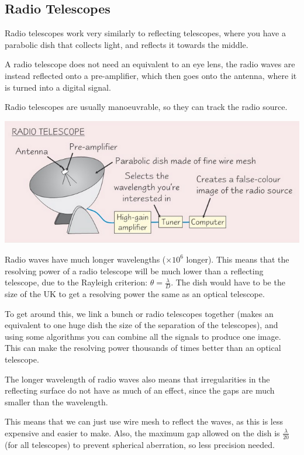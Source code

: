 \documentclass[a4paper, 12pt]{article}
\begin{document}
\subsection{Radio Telescopes}

Radio telescopes work very similarly to reflecting telescopes, where you have a parabolic dish that collects light, and reflects it towards the middle.

A radio telescope does not need an equivalent to an eye lens, the radio waves are instead reflected onto a pre-amplifier, which then goes onto the antenna, where it is turned into a digital signal.

Radio telescopes are usually manoeuvrable, so they can track the radio source.

\begin{center}
\includegraphics[width=\textwidth]{images/radioTelescope.png}
\end{center}

Radio waves have much longer wavelengths ($\times 10^6$ longer). This means that the resolving power of a radio telescope will be much lower than a reflecting telescope, due to the Rayleigh criterion: $\theta = \frac{\lambda}{D}$. The dish would have to be the size of the UK to get a resolving power the same as an optical telescope.

To get around this, we link a bunch or radio telescopes together (makes an equivalent to one huge dish the size of the separation of the telescopes), and using some algorithms you can combine all the signals to produce one image. This can make the resolving power thousands of times better than an optical telescope.

The longer wavelength of radio waves also means that irregularities in the reflecting surface do not have as much of an effect, since the gaps are much smaller than the wavelength.

This means that we can just use wire mesh to reflect the waves, as this is less expensive and easier to make. Also, the maximum gap allowed on the dish is $\frac{\lambda}{20}$ (for all telescopes) to prevent spherical aberration, so less precision needed.
\end{document}
